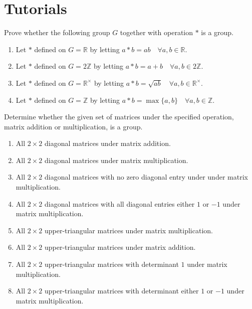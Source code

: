 \section*{Tutorials}

\begin{mdframed}
    \vspace{-0.25cm}
    \hspace{-0.25cm}
    \begin{Exercise}
        Prove whether the following group $G$ together with operation $*$ is a group.
        \begin{enumerate}
            \item Let $*$ defined on $G = \mathbb{R}$ by letting $a * b = ab \quad \forall a, b \in \mathbb{R}$.
            \item Let $*$ defined on $G = 2\mathbb{Z}$ by letting $a * b = a + b \quad \forall a, b \in 2\mathbb{Z}$.
            \item Let $*$ defined on $G = \mathbb{R}^\times$ by letting $a * b = \sqrt{ab} \quad \forall a, b \in \mathbb{R}^\times$.
            \item Let $*$ defined on $G = \mathbb{Z}$ by letting $a * b = \max \{a,b\} \quad \forall a, b \in \mathbb{Z}$.
        \end{enumerate}
    \end{Exercise}

    \vspace{0.752cm}
    \begin{Exercise}
        Determine whether the given set of matrices under the specified operation, matrix addition or multiplication, is a group.
        \begin{enumerate}
            \item All $2 \times 2$ diagonal matrices under matrix addition.
            \item All $2 \times 2$ diagonal matrices under matrix multiplication.
            \item All $2 \times 2$ diagonal matrices with no zero diagonal entry under under matrix multiplication.
            \item All $2 \times 2$ diagonal matrices with all diagonal entries either $1$ or $-1$ under matrix multiplication.
            \item All $2 \times 2$ upper-triangular matrices under matrix multiplication.
            \item All $2 \times 2$ upper-triangular matrices under matrix addition.
            \item All $2 \times 2$ upper-triangular matrices with determinant $1$ under matrix multiplication.
            \item All $2 \times 2$ upper-triangular matrices with determinant either $1$ or $-1$ under matrix multiplication.
        \end{enumerate}
    \end{Exercise}


\end{mdframed}
